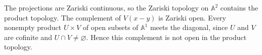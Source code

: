 The projections are Zariski continuous, so the Zariski topology on $\mathbb A^2$ contains the product topology. The complement of $V(x-y)$ is Zariski open. Every nonempty product $U\times V$ of open subsets of $\mathbb A^1$ meets the diagonal, since $U$ and $V$ are cofinite and $U\cap V\ne\varnothing$. Hence this complement is not open in the product topology.
